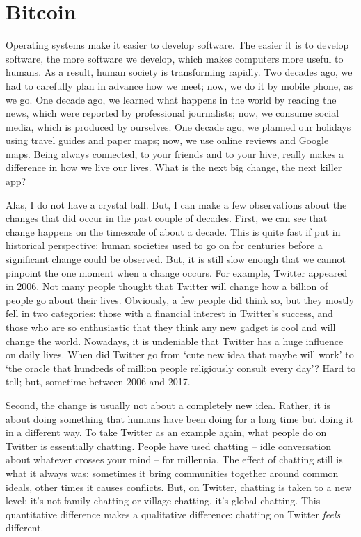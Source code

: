\chapter{Bitcoin}\label{ch:bitcoin}

Operating systems make it easier to develop software.
The easier it is to develop software, the more software we develop, which makes computers more useful to humans.
As a result, human society is transforming rapidly.
Two decades ago, we had to carefully plan in advance how we meet; now, we do it by mobile phone, as we go.
One decade ago, we learned what happens in the world by reading the news, which were reported by professional journalists; now, we consume social media, which is produced by ourselves.
One decade ago, we planned our holidays using travel guides and paper maps; now, we use online reviews and Google maps.
Being always connected, to your friends and to your hive, really makes a difference in how we live our lives.
What is the next big change, the next killer app?

Alas, I do not have a crystal ball.
But, I can make a few observations about the changes that did occur in the past couple of decades.
First, we can see that change happens on the timescale of about a decade.
This is quite fast if put in historical perspective: human societies used to go on for centuries before a significant change could be observed.
But, it is still slow enough that we cannot pinpoint the one moment when a change occurs.
For example, Twitter appeared in 2006.
Not many people thought that Twitter will change how a billion of people go about their lives.
Obviously, a few people did think so, but they mostly fell in two categories: those with a financial interest in Twitter's success, and those who are so enthusiastic that they think any new gadget is cool and will change the world.
Nowadays, it is undeniable that Twitter has a huge influence on daily lives.
When did Twitter go from `cute new idea that maybe will work' to `the oracle that hundreds of million people religiously consult every day'?
Hard to tell; but, sometime between 2006 and 2017.

Second, the change is usually not about a completely new idea.
Rather, it is about doing something that humans have been doing for a long time but doing it in a different way.
To take Twitter as an example again, what people do on Twitter is essentially chatting.
People have used chatting -- idle conversation about whatever crosses your mind -- for millennia.
The effect of chatting still is what it always was: sometimes it bring communities together around common ideals, other times it causes conflicts.
But, on Twitter, chatting is taken to a new level: it's not family chatting or village chatting, it's global chatting.
This quantitative difference makes a qualitative difference: chatting on Twitter \emph{feels} different.

